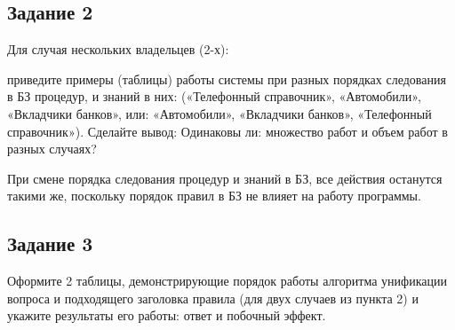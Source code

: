 \subsection{Задание 2}

Для случая нескольких владельцев (2-х):

приведите примеры (таблицы) работы системы при разных порядках следования в БЗ  процедур, и знаний в них: («Телефонный справочник», «Автомобили», «Вкладчики банков», или: «Автомобили», «Вкладчики банков», «Телефонный справочник»). Сделайте вывод: Одинаковы ли: множество работ и объем работ в разных случаях?

При смене порядка следования процедур и знаний в БЗ, все действия останутся такими же, поскольку порядок правил в БЗ не влияет на работу программы.

\subsection{Задание 3}

Оформите 2 таблицы, демонстрирующие порядок работы алгоритма унификации вопроса и подходящего заголовка правила (для двух случаев из пункта 2) и укажите результаты его работы: ответ и побочный эффект.

